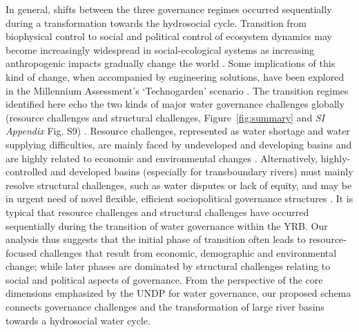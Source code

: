 In general, shifts between the three governance regimes occurred sequentially during a transformation towards the hydrosocial cycle.
Transition from biophysical control to social and political control of ecosystem dynamics may become increasingly widespread in social-ecological systems as increasing anthropogenic impacts gradually change the world  
\cite{bestPaceHumanInducedChange2020,cummingLinkingeconomicgrowth2018,cummingImplicationsagriculturaltransitions2014}. 
Some implications of this kind of change, when accompanied by engineering solutions, have been explored in the Millennium Assessment’s `Technogarden' scenario 
\cite{millenniumecosystemassessmentEcosystemshumanwellbeing2005}. 
The transition regimes identified here echo the two kinds of major water governance challenges globally (resource challenges and structural challenges, Figure~\ref{fig:summary} and \textit{SI Appendix} Fig. S9)
\cite{singhWaterGovernanceChallenges2019,porcherFacingChallengesWater2019}. 
Resource challenges, represented as water shortage and water supplying difficulties, are mainly faced by undeveloped and developing basins and are highly related to economic and environmental changes
\cite{allanNavigatingcomplexitiescoordinated2019,florkeWatercompetitioncities2018,liuWaterSustainabilityChina2012}. 
Alternatively, highly-controlled and developed basins (especially for transboundary rivers) must mainly resolve structural challenges, such as water disputes or lack of equity, and may be in urgent need of novel flexible, efficient sociopolitical governance structures 
\cite{kitroeffThisWarCrossBorder2020,kitroeffThisWarCrossBorder2020,roobavannanRoleSectoralTransformation2017,unep-dhiTransboundaryRiverBasins2016}. 
It is typical that resource challenges and structural challenges have occurred sequentially during the transition of water governance within the YRB. 
Our analysis thus suggests that the initial phase of transition often leads to resource-focused challenges that result from economic, demographic and environmental change; while later phases are dominated by structural challenges relating to social and political aspects of governance.
From the perspective of the core dimensions emphasized by the UNDP for water governance, our proposed schema connects governance challenges and the transformation of large river basins towards a hydrosocial water cycle. 

